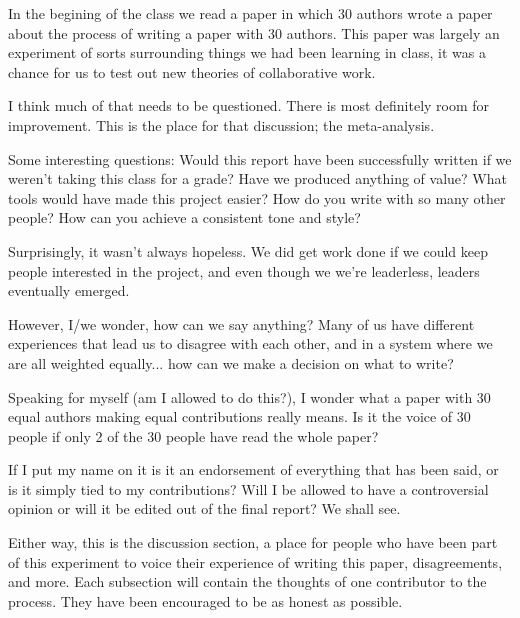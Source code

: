 In the begining of the class we read a paper \cite{tomlinson2012} in which 30 authors wrote a paper about the process of writing a paper with 30 authors. This paper was largely an experiment of sorts surrounding things we had been learning in class, it was a chance for us to test out new theories of collaborative work.

I think much of that needs to be questioned. There is most definitely room for improvement. This is the place for that discussion; the meta-analysis.

Some interesting questions:
Would this report have been successfully written if we weren't taking this class for a grade?
Have we produced anything of value?
What tools would have made this project easier? 
How do you write with so many other people? How can you achieve a consistent tone and style? 

Surprisingly, it wasn't always hopeless. We did get work done if we could keep people interested in the project, and even though we we're leaderless, leaders eventually emerged.  

However, I/we wonder, how can we say anything? Many of us have different experiences that lead us to disagree with each other, and in a system where we are all weighted equally... how can we make a decision on what to write?

Speaking for myself (am I allowed to do this?), I wonder what a paper with 30 equal authors making equal contributions really means. Is it the voice of 30 people if only 2 of the 30 people have read the whole paper?

If I put my name on it is it an endorsement of everything that has been said, or is it simply tied to my contributions? Will I be allowed to have a controversial opinion or will it be edited out of the final report? We shall see.

Either way, this is the discussion section, a place for people who have been part of this experiment to voice their experience of writing this paper, disagreements, and more. Each subsection will contain the thoughts of one contributor to the process. They have been encouraged to be as honest as possible.




